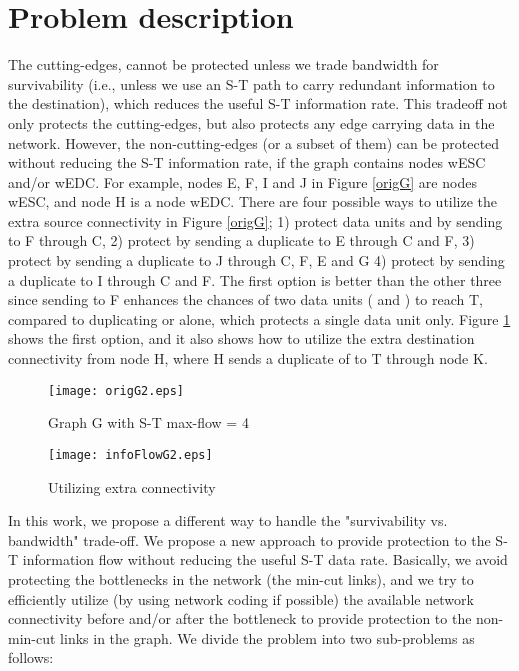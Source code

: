 \documentclass[conference]{IEEEtran}
\begin{document}
\section{Problem description}
\label{Sec:problem}

The cutting-edges, cannot be protected unless we trade bandwidth for survivability (i.e., unless we use an S-T path to carry redundant information to the destination), which reduces the useful S-T information rate. This tradeoff not only protects the cutting-edges, but also protects any edge carrying data in the network. However, the non-cutting-edges (or a subset of them) can be protected without reducing the S-T information rate, if the graph contains nodes wESC and/or wEDC. For example, nodes E, F, I and J in Figure \ref{origG} are nodes wESC, and node H is a node wEDC. There are four possible ways to utilize the extra source connectivity in Figure \ref{origG}; 1) protect data units  and  by sending  to F through C, 2) protect  by sending a duplicate to E through C and F, 3) protect  by sending a duplicate to J through C, F, E and G 4) protect  by sending a duplicate to I through C and F. The first option is better than the other three since sending  to F enhances the chances of two data units ( and ) to reach T, compared to duplicating  or  alone, which protects a single data unit only. Figure \ref{infoFlowG} shows the first option, and it also shows how to utilize the extra destination connectivity from node H, where H sends a duplicate of  to T through node K.



\begin{figure}[tbh]
\begin{minipage}[b]{0.3\linewidth}
\centering
\texttt{[image: origG2.eps]}
\caption{Graph G with S-T max-flow = 4}
\label{origG}
\end{minipage}
\hspace{1.5cm}
\begin{minipage}[b]{0.3\linewidth}
\centering
\texttt{[image: infoFlowG2.eps]}
\caption{Utilizing extra connectivity}
\label{infoFlowG}
\end{minipage}
\end{figure}

In this work, we propose a different way to handle the "survivability vs. bandwidth" trade-off. We propose a new approach to provide protection to the S-T information flow without reducing the useful S-T data rate. Basically, we avoid protecting the bottlenecks in the network (the min-cut links), and we try to efficiently utilize (by using network coding if possible) the available network connectivity before and/or after the bottleneck to provide protection to the non-min-cut links in the graph. We divide the problem into two sub-problems as follows:
\end{document}
